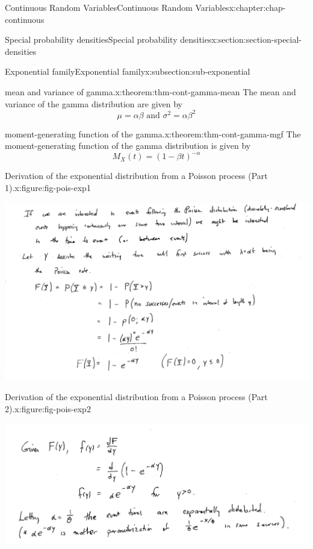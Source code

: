 \documentclass[oneside,10pt,]{book}
\numberwithin{equation}{section}
\begin{document}
\begin{chapterptx}{Continuous Random Variables}{}{Continuous Random Variables}{}{}{x:chapter:chap-continuous}
\begin{sectionptx}{Special probability densities}{}{Special probability densities}{}{}{x:section:section-special-densities}
\begin{subsectionptx}{Exponential family}{}{Exponential family}{}{}{x:subsection:sub-exponential}
\begin{theorem}{mean and variance of gamma.}{}{x:theorem:thm-cont-gamma-mean}%
The mean and variance of the gamma distribution are given by%
\begin{equation*}
\mu = \alpha\beta\text{ and }\sigma^2 = \alpha\beta^2
\end{equation*}
%
\end{theorem}
\begin{theorem}{moment-generating function of the gamma.}{}{x:theorem:thm-cont-gamma-mgf}%
The moment-generating function of the gamma distribution is given by%
\begin{equation*}
M_X(t) = (1-\beta t)^{-\alpha}
\end{equation*}
%
\end{theorem}
\begin{figureptx}{Derivation of the exponential distribution from a Poisson process (Part 1).}{x:figure:fig-pois-exp1}{}%
\begin{image}{0.1}{0.8}{0.1}%
\includegraphics[width=\linewidth]{./images/poisson_exp.png}
\end{image}%
\tcblower
\end{figureptx}%
\begin{figureptx}{Derivation of the exponential distribution from a Poisson process (Part 2).}{x:figure:fig-pois-exp2}{}%
\begin{image}{0.1}{0.8}{0.1}%
\includegraphics[width=\linewidth]{./images/poisson_exp2.png}

\end{image}
\end{figureptx}
\end{subsectionptx}
\end{sectionptx}
\end{chapterptx}
\end{document}
